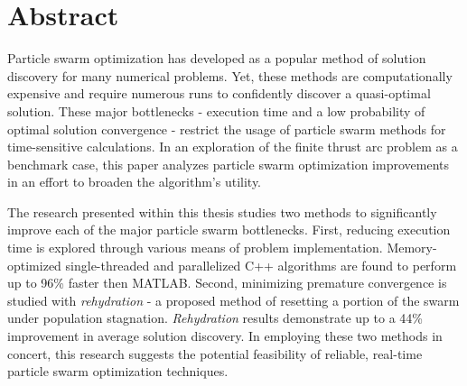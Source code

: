 
\cleardoublepage
\thispagestyle{empty} %

\chapter*{Abstract} %

\noindent Particle swarm optimization has developed as a popular method of solution 
discovery for many numerical problems. Yet, these methods are computationally expensive and require
numerous runs to confidently discover a quasi-optimal solution. These major bottlenecks - execution time and 
a low probability of optimal solution convergence - restrict the usage of particle swarm methods for time-sensitive calculations. 
In an exploration of the finite thrust arc problem as a benchmark case, this paper analyzes particle swarm
optimization improvements in an effort to broaden the algorithm's utility.\newline

\noindent The research presented within this thesis studies two methods to significantly improve each of the major particle swarm bottlenecks.
First, reducing execution time is explored through various means of problem implementation. 
Memory-optimized single-threaded and parallelized C++ algorithms
are found to perform up to 96\% faster then MATLAB. 
Second, minimizing premature convergence is studied with \textit{rehydration} - a proposed method of resetting a portion of the
swarm under population stagnation. 
\textit{Rehydration} results demonstrate up to a 44\% improvement in average solution discovery. In employing these two methods in concert, this
research suggests the potential feasibility of reliable, real-time particle swarm optimization techniques.\newline

\cleardoublepage
